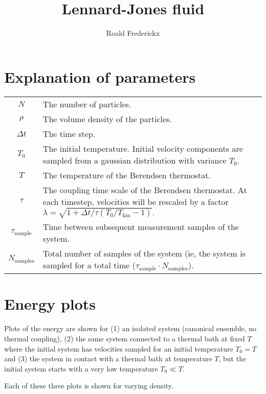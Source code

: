 \documentclass[11pt,a4paper]{article}
\begin{document}
\author{Roald Frederickx}
\title{Lennard-Jones fluid}
\date{}
\maketitle

\section{Explanation of parameters}
\begin{center}
\begin{tabularx}{\linewidth}{c | X}
$N$&	The number of particles.\\[5pt]
$\rho$&	The volume density of the particles.\\[5pt]
$\Delta t$&	The time step.\\[5pt]
$T_0$&		The initial temperature. Initial velocity components are sampled from a gaussian distribution with variance $T_0$.\\[5pt]
$T$&		The temperature of the Berendsen thermostat.\\[5pt]
$\tau$&		The coupling time scale of the Berendsen thermostat. At each timestep, velocities will be rescaled by a factor $\lambda = \sqrt{1 + \Delta t/\tau\left(T_0/T_{\mathrm{kin}} - 1\right)}.$\\[5pt]
$\tau_{\mathrm{sample}}$&	Time between subsequent measurement samples of the system.\\[5pt]
$N_{\mathrm{samples}}$&		Total number of samples of the system (ie, the system is sampled for a total time ($\tau_\mathrm{sample} \cdot N_\mathrm{samples}$).\\
\end{tabularx}
\end{center}

\section{Energy plots}
Plots of the energy are shown for (1) an isolated system (canonical ensemble, no thermal coupling), (2) the same system connected to a thermal bath at fixed $T$ where the initial system has velocities sampled for an initial temperature $T_0 = T$ and (3) the system in contact with a thermal bath at temperature $T$, but the initial system starts with a very low temperature $T_0 \ll T$.

Each of these three plots is shown for varying density.
\end{document}

